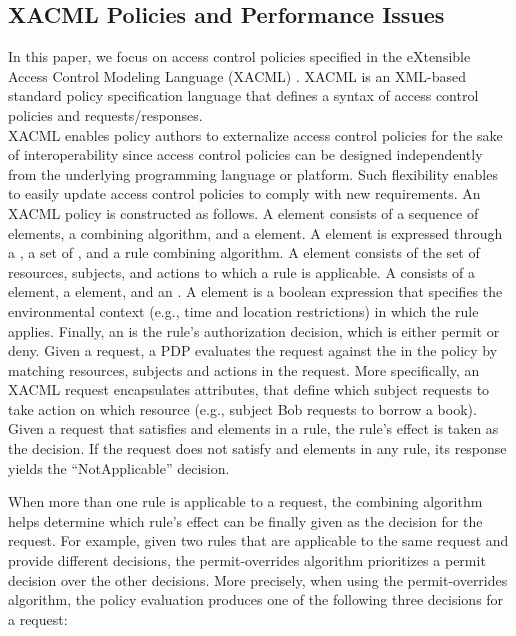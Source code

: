 \subsection{XACML Policies and Performance Issues}
In this paper, we focus on access control policies specified in the eXtensible Access Control Modeling Language (XACML) \cite{sunxacml}. 
XACML is an XML-based standard policy specification language that defines a syntax of access control policies and requests/responses. \\XACML enables policy authors to externalize access control policies
 for the sake of interoperability since access control policies can be designed independently from the underlying programming language or platform. 
Such flexibility enables to easily update access control policies to comply with new requirements. An XACML policy is constructed as follows.
A  element consists of a sequence of  elements, a combining algorithm, and
a  element. A  element is expressed through a , a set of , and a rule combining algorithm. 
A  element consists of the set of resources, subjects, and actions to which a rule is applicable. A  consists of a 
 element, a  element, and an . A  element is a boolean expression that specifies the
environmental context (e.g., time and location restrictions) in which the rule applies.
Finally, an  is the rule's authorization decision, which is either permit or deny.
Given a request, a PDP evaluates the request against the  in the policy by matching resources, subjects and actions in the request.
More specifically, an XACML request encapsulates attributes, that define which subject requests to take action on which resource (e.g., subject Bob requests to borrow a book).
Given a request that satisfies  and  elements in a rule, the rule's effect is taken as the decision. 
If the request does not satisfy  and  elements in any rule, its response yields the ``NotApplicable'' decision.

When more than one rule is applicable to a request, the combining algorithm helps determine which rule's effect can be finally given as the decision for the request.
For example, given two rules that are applicable to the same request and provide different decisions,
the permit-overrides algorithm prioritizes a permit decision over the other decisions.
More precisely, when using the permit-overrides algorithm, the policy evaluation produces one of the following three decisions for a request: 

